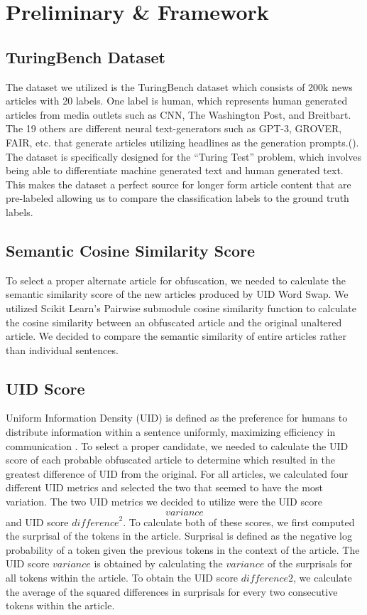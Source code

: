 \documentclass{article}
\begin{document}
\section{Preliminary \& Framework}
\subsection{TuringBench Dataset}
The dataset we utilized is the TuringBench dataset which consists of 200k news articles with 20 labels. One label is human, which represents human generated articles from media outlets such as CNN, The Washington Post, and Breitbart. The 19 others are different neural text-generators such as GPT-3, GROVER, FAIR, etc. that generate articles utilizing headlines as the generation prompts.(\cite{Uchendu2021-ed}). The dataset is specifically designed for the “Turing Test” problem, which involves being able to differentiate machine generated text and human generated text. This makes the dataset a perfect source for longer form article content that are pre-labeled allowing us to compare the classification labels to the ground truth labels.

\subsection{Semantic Cosine Similarity Score}
To select a proper alternate article for obfuscation, we needed to calculate the semantic similarity score of the new articles produced by UID Word Swap. We utilized Scikit Learn's Pairwise submodule cosine similarity function to calculate the cosine similarity between an obfuscated article and the original unaltered article. We decided to compare the semantic similarity of entire articles rather than individual sentences.

\subsection{UID Score}
Uniform Information Density (UID) is defined as the preference for humans to distribute information within a sentence uniformly, maximizing efficiency in communication \cite{Meister2021-tu}. To select a proper candidate, we needed to calculate the UID score of each probable obfuscated article to determine which resulted in the greatest difference of UID from the original. For all articles, we calculated four different UID metrics and selected the two that seemed to have the most variation. The two UID metrics we decided to utilize were the UID score $$variance$$ and UID score ${difference}^2$. To calculate both of these scores, we first computed the surprisal of the tokens in the article. Surprisal is defined as the negative log probability of a token given the previous tokens in the context of the article. The UID score $variance$ is obtained by calculating the $variance$ of the surprisals for all tokens within the article. To obtain the UID score ${difference}2$, we calculate the average of the squared differences in surprisals for every two consecutive tokens within the article.
\end{document}
